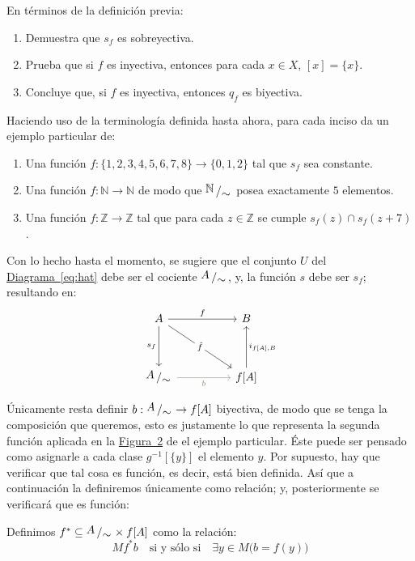 \documentclass[letterpaper,DIV=14,headsepline,12pt]{scrartcl}
\newcommand{\pts}{}
\newenvironment{ejercicio}[1]{\ifthenelse{\equal{#1}{1} \OR \equal{#1}{+1}}{\renewcommand{\pts}{\textbf{(#1 pt)}}}{\renewcommand{\pts}{\textbf{(#1 pts)}}}\begin{ejj}\upshape \pts}{\end{ejj}}
\newcommand{\quot}[2]{{\raisebox{.2em}{$#1$}\left/\raisebox{-.2em}{$#2$}\right.}}
\begin{document}
    \begin{ejercicio}{1.5}
        En términos de la definición previa:
        \begin{enumerate}
            \item Demuestra que $s_f$ es sobreyectiva.
            \item Prueba que si $f$ es inyectiva, entonces para cada $x \in X$, $[x]=\{x\}$.
            \item Concluye que, si $f$ es inyectiva, entonces $q_f$ es biyectiva.
        \end{enumerate}
    \end{ejercicio}

    \begin{ejercicio}{1.5}
        Haciendo uso de la terminología definida hasta ahora, para cada inciso da un ejemplo particular de:
        \begin{enumerate}
            \item Una función $f:\{1,2,3,4,5,6,7,8\} \to \{0,1,2\}$ tal que $s_f$ sea constante.
            \item Una función $f:\mathbb{N} \to \mathbb{N}$ de modo que $\quot{\mathbb{N}}{\sim}$ posea exactamente $5$ elementos.
            \item Una función $f:\mathbb{Z} \to \mathbb{Z}$ tal que para cada $z \in \mathbb{Z}$ se cumple $s_f(z) \cap s_f(z+7)$.
        \end{enumerate}
    \end{ejercicio}

    Con lo hecho hasta el momento, se sugiere que el conjunto $U$ del \hyperref[eq:hat]{Diagrama~\ref*{eq:hat}} debe ser el cociente $\quot{A}{\sim}$, y, la función $s$ debe ser $s_f$; resultando en:
    \begin{equation}\label{eq:casi}
        \begin{tikzcd}
            A && B \\
            \\
            \quot{A}{\sim} && {f[A]}
            \arrow["f", from=1-1, to=1-3]
            \arrow["s_f"', from=1-1, to=3-1]
            \arrow["{\hat{f}}"{description}, from=1-1, to=3-3]
            \arrow["b"', from=3-1, to=3-3, draw=Cornsilk4, text=Cornsilk4]
            \arrow["{i_{f[A],B}}"', from=3-3, to=1-3]
        \end{tikzcd}
    \end{equation}

    Únicamente resta definir $b:\quot{A}{\sim} \to f[A]$ biyectiva, de modo que se tenga la composición que queremos, esto es justamente lo que representa la segunda función aplicada en la \hyperref[fig:g]{Figura~2} de el ejemplo particular. Éste puede ser pensado como asignarle a cada clase $g^{-1}[\{y\}]$ el elemento $y$. Por supuesto, hay que verificar que tal cosa es función, es decir, está bien definida. Así que a continuación la definiremos únicamente como relación; y, posteriormente se verificará que es función:
    \begin{definicion}
        Definimos $f^* \subseteq \quot{A}{\sim} \times f[A]$ como la relación:
        \[  M f^* b \quad \text{si y sólo si} \quad \exists y \in M \big( b=f(y) \big) \]
    \end{definicion}
\end{document}
